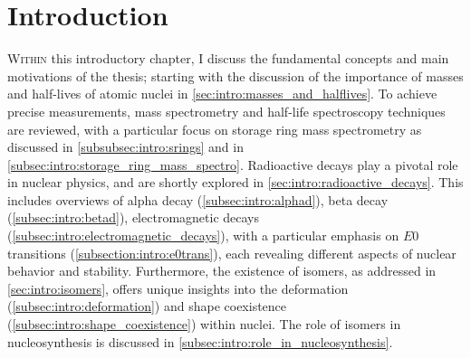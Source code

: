 
\chapter{Introduction}\label{chapter:introduction}
\lettrine{W}{ithin} this introductory chapter, I discuss the fundamental concepts and main motivations of the thesis; starting with the discussion of the importance of masses and half-lives of atomic nuclei in \cref{sec:intro:masses_and_halflives}. 
\newpar
To achieve precise measurements, mass spectrometry and half-life spectroscopy techniques are reviewed, with a particular focus on storage ring mass spectrometry as discussed in \cref{subsubsec:intro:srings} and in \cref{subsec:intro:storage_ring_mass_spectro}.
\newpar
Radioactive decays play a pivotal role in nuclear physics, and are shortly explored in \cref{sec:intro:radioactive_decays}. This includes overviews of alpha decay (\cref{subsec:intro:alphad}), beta decay (\cref{subsec:intro:betad}), electromagnetic decays (\cref{subsec:intro:electromagnetic_decays}), with a particular emphasis on $E0$ transitions (\cref{subsection:intro:e0trans}), each revealing different aspects of nuclear behavior and stability.
\newpar
Furthermore, the existence of isomers, as addressed in \cref{sec:intro:isomers}, offers unique insights into the deformation (\cref{subsec:intro:deformation}) and shape coexistence (\cref{subsec:intro:shape_coexistence}) within nuclei. The role of isomers in nucleosynthesis is discussed in \cref{subsec:intro:role_in_nucleosynthesis}.

